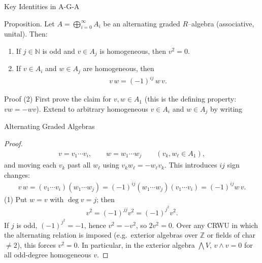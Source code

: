\begin{frame}{Key Identities in A-G-A}
\begin{block}{Proposition.}
Let $A=\bigoplus_{i=0}^\infty A_i$ be an alternating graded $R$–algebra (associative, unital). Then:
\begin{enumerate}
\item If $j\in\mathbb{N}$ is odd and $v\in A_j$ is homogeneous, then $v^2=0$.
\item If $v\in A_i$ and $w\in A_j$ are homogeneous, then
\begin{align*}
v\,w = (-1)^{ij} \, w\,v .
\end{align*}
\end{enumerate}
\end{block}

\begin{block}{Proof}
(2) First prove the claim for $v,w\in A_1$ (this is the defining property: $vw=-wv$).
Extend to arbitrary homogeneous $v\in A_i$ and $w\in A_j$ by writing
\end{block}
\end{frame}

\begin{frame}{Alternating Graded Algebras}
\vspace{-0.3cm}
\begin{proof}
\vspace{-0.9cm}
\begin{align*}
v = v_1\cdots v_i,\qquad w = w_1\cdots w_j \qquad (v_k,w_\ell\in A_1),
\end{align*}
and moving each $v_k$ past all $w_\ell$ using $v_k w_\ell = - w_\ell v_k$. This introduces $ij$ sign changes:
\vspace{-0.2cm}
\begin{align*}
v\,w = (v_1\cdots v_i)(w_1\cdots w_j) = (-1)^{ij} (w_1\cdots w_j)(v_1\cdots v_i) = (-1)^{ij} w\,v.
\end{align*}
(1) Put $w=v$ with $\deg v = j$; then
\vspace{-0.2cm}
\begin{align*}
v^2 = (-1)^{jj} v^2 = (-1)^{j^2} v^2.
\end{align*}
If $j$ is odd, $(-1)^{j^2}=-1$, hence $v^2=-v^2$, so $2v^2=0$.
Over any CRWU in which the alternating relation is imposed (e.g.\ exterior algebras over $\mathbb{Z}$ or fields of char $\ne 2$), this forces $v^2=0$. In particular, in the exterior algebra $\bigwedge V$, $v\wedge v=0$ for all odd-degree homogeneous $v$.
\end{proof}
\end{frame}

